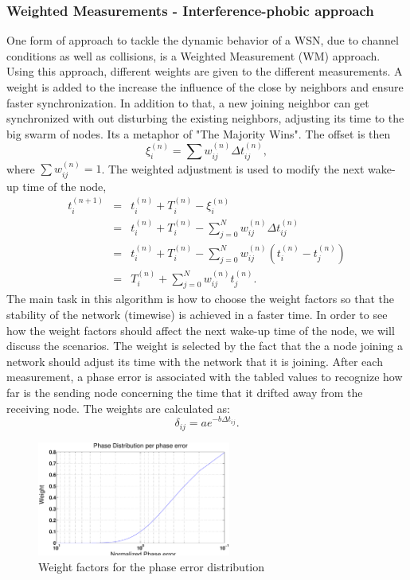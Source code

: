\documentclass[journal]{IEEEtran}
\begin{document}
\subsubsection{\textbf{Weighted Measurements - Interference-phobic approach}}
One form of approach to tackle the dynamic behavior of a WSN, due to channel conditions as well as collisions, is a
Weighted Measurement (WM) approach. Using this approach, different
weights are given to the different measurements. A weight is added to
the increase the influence of the close by neighbors and ensure
faster synchronization. In addition to that, a new joining neighbor
can get synchronized with out disturbing the existing neighbors,
adjusting its time to the big swarm of nodes. Its a metaphor of "The
Majority Wins". \newline
The offset is then 
\begin{equation}
\xi_i^{(n)} = \sum{w_{ij}^{(n)}\Delta t_{ij}^{(n)}} ,
\end{equation}
where $\sum{w_{ij}^{(n)}= 1}$.
\newline
The weighted adjustment is used to modify the next wake-up time of
the node,
\begin{eqnarray*}
t_i^{(n+1)} &=& t_i^{(n)} + T_i^{(n)} - \xi_i^{(n)} \\ &=& t_i^{(n)}
+ T_i^{(n)} - \sum_{j=0}^N{w_{ij}^{(n)}\Delta t_{ij}^{(n)}} \\ &=&
t_i^{(n)}+ T_i^{(n)} -
\sum_{j=0}^N{w_{ij}^{(n)}(t_i^{(n)}-t_j^{(n)})} \\ &=& T_i^{(n)} + \sum_{j=0}^N{w_{ij}^{(n)}t_j^{(n)}}.
\end{eqnarray*}
\newline
The main task in this algorithm is how to choose the weight factors so that the
stability of the network (timewise) is achieved in a faster time. In
order to see how the weight factors should affect the next wake-up
time of the node, we will discuss the scenarios.
\newline
The weight is selected by the fact that the a node joining a network
should adjust its time with the network that it is joining. After
each measurement, a phase error is associated with the tabled values
to recognize how far is the sending node concerning the time that it
drifted away from the receiving node. The weights are calculated as:
\begin{equation}
\delta_{ij} = ae^{-b\Delta t_{ij}}.
\end{equation}
\begin{figure}[t]
\centering
\includegraphics[width= 2.5in]{weight}
\caption{Weight factors for the phase error distribution}
\label{weight}
\end{figure}
\end{document}
